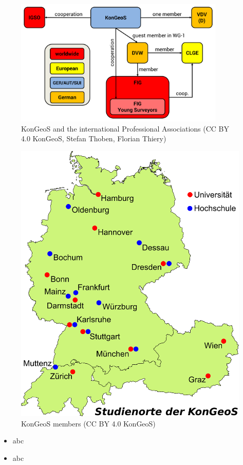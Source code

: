 \documentclass[a4paper]{article}
\begin{document}
\begin{figure}[!htb]
\begin{center}
\includegraphics[width=10cm]{GeodaetischesNetzwerk.png}
\caption{KonGeoS and the international Professional Associations (CC BY 4.0 KonGeoS, Stefan Thoben, Florian Thiery)}
\label{Abb2}
\end{center}
\end{figure}

\begin{figure}[!htb]
\begin{center}
\includegraphics[width=12cm]{karte.png}
\caption{KonGeoS members (CC BY 4.0 KonGeoS)}
\label{Abb3}
\end{center}
\end{figure}

\begin{itemize}
	\item abc
	\item abc
\end{itemize}
\end{document}
